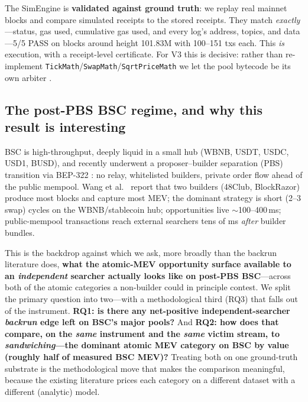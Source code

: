 \documentclass[11pt]{article}
\newcommand{\code}[1]{\texttt{#1}}
\begin{document}
The SimEngine is \textbf{validated against ground truth}: we replay real mainnet
blocks and compare simulated receipts to the stored receipts. They match
\emph{exactly}---status, gas used, cumulative gas used, and every log's address,
topics, and data---5/5 PASS on blocks around height 101.83M with 100--151 txs each.
This \emph{is} execution, with a receipt-level certificate. For V3 this is decisive:
rather than re-implement \code{TickMath}/\code{SwapMath}/\code{SqrtPriceMath} we let
the pool bytecode be its own arbiter \cite{adams2021uniswapv3,diamandis2023routing}.

\subsection{The post-PBS BSC regime, and why this result is interesting}
BSC is high-throughput, deeply liquid in a small hub (WBNB, USDT, USDC, USD1, BUSD),
and recently underwent a proposer--builder separation (PBS) transition via BEP-322
\cite{bep322}: no relay, whitelisted builders, private order flow ahead of the
public mempool. Wang et al.\ \cite{wang2025binance} report that two builders
(48Club, BlockRazor) produce most blocks and capture most MEV; the dominant strategy
is short (2--3 swap) cycles on the WBNB/stablecoin hub; opportunities live
$\sim$100--400\,ms; public-mempool transactions reach external searchers tens of ms
\emph{after} builder bundles.

This is the backdrop against which we ask, more broadly than the backrun literature
does, \textbf{what the atomic-MEV opportunity surface available to an
\emph{independent} searcher actually looks like on post-PBS BSC}---across both of the
atomic categories a non-builder could in principle contest. We split the primary
question into two---with a methodological third (RQ3) that falls out of the
instrument. \textbf{RQ1: is there any net-positive independent-searcher
\emph{backrun} edge left on BSC's major pools?} And \textbf{RQ2: how does that
compare, on the \emph{same} instrument and the \emph{same} victim stream, to
\emph{sandwiching}---the dominant atomic MEV category on BSC by value (roughly half
of measured BSC MEV)?} Treating both on one ground-truth substrate is the
methodological move that makes the comparison meaningful, because the existing
literature prices each category on a different dataset with a different (analytic)
model.
\end{document}
